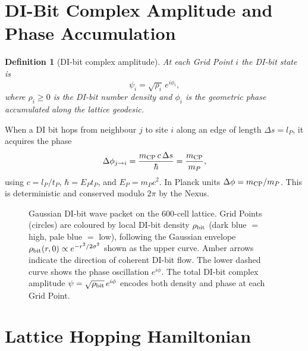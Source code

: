 \documentclass[11pt,a4paper]{article}
\newtheorem{definition}[theorem]{Definition}
\newcommand{\lP}{l_P}
\newcommand{\tP}{t_P}
\newcommand{\EP}{E_P}
\newcommand{\mP}{m_P}
\begin{document}
\section{DI-Bit Complex Amplitude and Phase Accumulation}

\begin{definition}[DI-bit complex amplitude]
At each Grid Point $i$ the DI-bit state is
\begin{equation}
\psi_i = \sqrt{\rho_i}\,e^{i\phi_i},
\label{eq:psi}
\end{equation}
where $\rho_i \ge 0$ is the DI-bit number density and $\phi_i$ is
the geometric phase accumulated along the lattice geodesic.
\end{definition}

When a DI bit hops from neighbour $j$ to site $i$ along an edge of
length $\Delta s = \lP$, it acquires the phase
\begin{equation}
\Delta\phi_{j\to i} = \frac{m_{\rm CP}\,c\,\Delta s}{\hbar}
= \frac{m_{\rm CP}}{\mP},
\label{eq:phasehop}
\end{equation}
using $c = \lP/\tP$, $\hbar = \EP\tP$, and $\EP = \mP c^2$.
In Planck units $\Delta\phi = m_{\rm CP}/\mP$.  This is deterministic
and conserved modulo $2\pi$ by the Nexus.

\begin{figure}[H]
\centering

\caption{Gaussian DI-bit wave packet on the 600-cell lattice.
  Grid Points (circles) are coloured by local DI-bit density
  $\rho_{\rm bit}$ (dark blue $=$ high, pale blue $=$ low),
  following the Gaussian envelope $\rho_{\rm bit}(r,0) \propto
  e^{-r^2/2\sigma^2}$ shown as the upper curve.
  Amber arrows indicate the direction of coherent DI-bit flow.
  The lower dashed curve shows the phase oscillation $e^{i\phi}$.
  The total DI-bit complex amplitude $\psi = \sqrt{\rho_{\rm bit}}\,e^{i\phi}$
  encodes both density and phase at each Grid Point.}
\label{fig:gaussian}
\end{figure}

\section{Lattice Hopping Hamiltonian}
\end{document}
